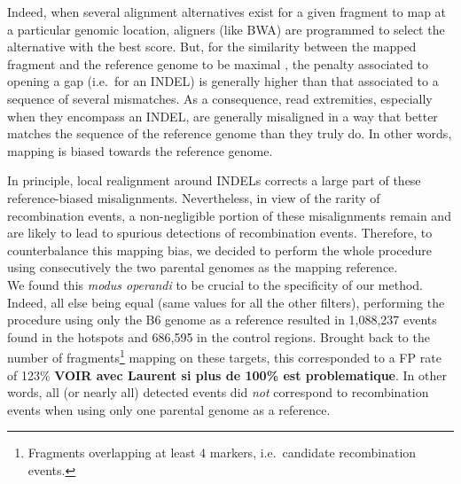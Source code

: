 Indeed, when several alignment alternatives exist for a given fragment to map at a particular genomic location, aligners (like BWA) are programmed to select the alternative with the best score.
But, for the similarity between the mapped fragment and the reference genome to be maximal \citep{smith1981identification}, the penalty associated to opening a gap (i.e.\ for an INDEL) is generally higher than that associated to a sequence of several mismatches.
As a consequence, read extremities, especially when they encompass an INDEL, are generally misaligned in a way that better matches the sequence of the reference genome than they truly do.
In other words, mapping is biased towards the reference genome.

In principle, local realignment around INDELs corrects a large part of these reference-biased misalignments.
Nevertheless, in view of the rarity of recombination events, a non-negligible portion of these misalignments remain and are likely to lead to spurious detections of recombination events.
Therefore, to counterbalance this mapping bias, we decided to perform the whole procedure using consecutively the two parental genomes as the mapping reference.\\


We found this \textit{modus operandi} to be crucial to the specificity of our method.
Indeed, all else being equal (same values for all the other filters), performing the procedure using only the B6 genome as a reference resulted in 1,088,237 events found in the hotspots and 686,595 in the control regions. Brought back to the number of fragments\footnote{Fragments overlapping at least 4 markers, i.e.\ candidate recombination events.} mapping on these targets, this corresponded to a FP rate of 123\% \textbf{VOIR avec Laurent si plus de 100\% est problematique}.
In other words, all (or nearly all) detected events did \textit{not} correspond to recombination events when using only one parental genome as a reference.

